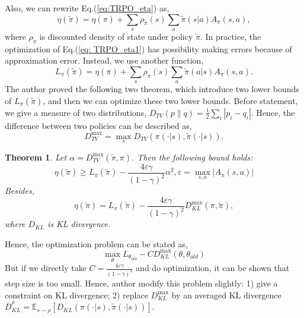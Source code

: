 \documentclass[11pt,a4paper]{article}
\def\tilde{\widetilde}
\def\epsilon{\varepsilon}
\def\tilde{\widetilde}
\def\bar{\overline}
\def\E{\mathbb{E}}
\newtheorem{theorem}{Theorem}[subsection]
\begin{document}
Also, we can rewrite Eq.(\ref{eq:TRPO_eta}) as, 
\begin{equation}
    \label{eq: TRPO_eta1}
    \eta(\tilde{\pi}) = \eta(\pi) + \sum_{s}\rho_{\tilde{\pi}}(s)\sum_a \tilde{\pi}(s|a)A_{\pi}(s,a),
\end{equation}
where $\rho_{\tilde{\pi}}$ is discounted density of state under policy $\tilde{\pi}$. In practice, the optimization of Eq.(\ref{eq: TRPO_eta1}) has possibility making errors because of approximation error. Instead, we use another function,
\begin{equation}
    L_{\pi}(\tilde{\pi}) =\eta(\pi) + \sum_s \rho_{\pi}(s) \sum_a \tilde{\pi}(a|s)A_{\pi}(s,a).
\end{equation}
The author proved the following two theorem, which introduce two lower bounds of $L_{\pi}(\tilde{\pi})$, and then we can optimize these two lower bounds. Before statement, we give a measure of two distributions, $D_{TV}(p\|q) = \frac{1}{2}\sum_i |p_i -q_i|$. Hence, the difference between two policies can be described as, 
\begin{equation}
    D_{TV}^{\max} = \max_s D_{TV}(\pi(\cdot|s), \tilde{\pi}(\cdot|s)).
\end{equation}
\begin{theorem}
    \label{th:TRPO_lowerbound}
    Let $\alpha = D_{TV}^{\max}(\tilde{\pi},\pi)$. Then the following bound holds:
    \begin{equation}
        \eta(\tilde{\pi}) \ge L_{\pi}(\tilde{\pi}) - \frac{4\epsilon\gamma}{(1-\gamma)^2}\alpha^2, \epsilon = \max_{s,a}|A_{\pi}(s,a)|
    \end{equation}
    Besides, 
    \begin{equation}
        \eta(\tilde{\pi}) = L_{\pi}(\tilde{\pi}) - \frac{4\epsilon\gamma}{(1-\gamma)^2}D_{KL}^{\max}(\pi,\tilde{\pi}),
    \end{equation}
    where $D_{KL}$ is KL divergence.
\end{theorem}
Hence, the optimization problem can be stated as,
\begin{equation}
\max_{\theta} L_{\theta_{old}} - C D_{KL}^{\max}(\theta,\theta_{old})
\end{equation}
But if we directly take $C=\frac{4\epsilon\gamma}{(1-\gamma)^2}$ and do optimization, it can be shown that step size is too small. Hence, author modify this problem slightly: 1) give a constraint on KL divergence; 2) replace $D_{KL}^{\max}$ by an averaged KL divergence $\bar{D}_{KL}^{\rho} = \E_{s\sim \rho}[D_{KL}(\pi(\cdot|s), \tilde{\pi}(\cdot|s))]$.
\end{document}
